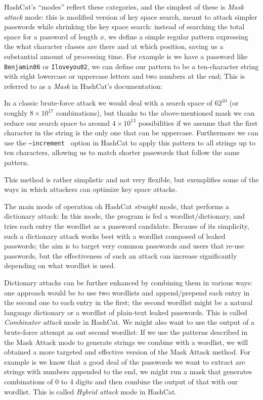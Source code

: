 HashCat's \enquote{modes} reflect these categories, and the simplest of these is \emph{Mask attack} mode: this is modified version of key space search, meant to attack simpler passwords while shrinking the key space search: 
instead of searching the total space for a password of length $x$, we define a simple regular pattern expressing the what character classes are there and at which position, saving us a substantial amount of processing time.
For example is we have a password like \texttt{Benjamin86} or \texttt{Iloveyou02}, we can define our pattern to be a ten-character string with eight lowercase or uppercase letters and two numbers at the end; This is referred to as a \emph{Mask} in HashCat's documentation:

In a classic brute-force attack we would deal with a search space of $62^{10}$ (or roughly $8 \times 10^{17}$ combinations), but thanks to the above-mentioned mask we can reduce our search space to around $4 \times 10^{13}$ possibilities if we assume that the first character in the string is the only one that can be uppercase.
Furthermore we can use the \texttt{--increment } option in HashCat to apply this pattern to all strings up to ten characters, allowing us to match shorter passwords that follow the same pattern.

This method is rather simplistic and not very flexible, but exemplifies some of the ways in which attackers can optimize key space attacks.\newline

The main mode of operation oh HashCat \emph{straight} mode, that performs a dictionary attack: In this mode, the program is fed a wordlist/dictionary, and tries each entry the wordlist as a password candidate. Because of its simplicity, such a dictionary attack works best with a wordlist composed of leaked passwords; the aim is to target very common passwords and users that re-use passwords, but the effectiveness of such an attack can increase significantly depending on what wordlist is used.

Dictionary attacks can be further enhanced by combining them in various ways: one approach would be to use two wordlists and append/prepend each entry in the second one to each entry in the first; 
the second wordlist might be a natural language dictionary or a wordlist of plain-text leaked passwords. This is called \emph{Combinator attack} mode in HashCat. 
We might also want to use the output of a brute-force attempt as out second wordlist: If we use the patterns described in the Mask Attack mode to generate strings we combine with a wordlist, we will obtained a more targeted and effective version of the Mask Attack method. 
For example is we know that a good deal of the passwords we want to extract are strings with numbers appended to the end, we might run a mask that generates combinations of 0 to 4 digits and then combine the output of that with our wordlist. This is called \emph{Hybrid attack } mode in HashCat.\newline

